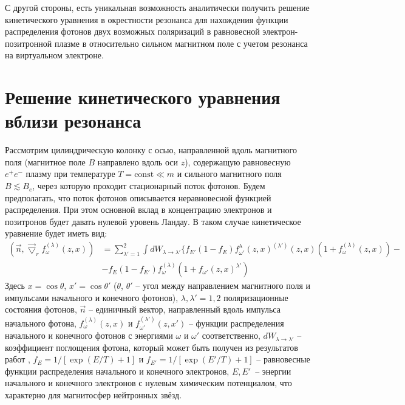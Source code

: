 \documentclass[a4paper]{panl}
\begin{document}
С другой стороны, есть уникальная возможность аналитически получить решение кинетического уравнения в окрестности резонанса для нахождения функции распределения фотонов двух возможных поляризаций в равновесной электрон-позитронной плазме в относительно сильном магнитном поле с учетом резонанса на виртуальном электроне.

\label{sec:preparation}
\section*{Решение кинетического уравнения вблизи резонанса}

Рассмотрим цилиндрическую колонку с осью, направленной вдоль магнитного поля (магнитное поле $B$ направлено вдоль оси $z$), содержащую равновесную $e^+e^-$ плазму при температуре $T=\text{const}\ll m$  и сильного магнитного поля $B\lesssim B_e$, через которую проходит стационарный поток фотонов. Будем предполагать, что поток фотонов описывается неравновесной функцией распределения. При этом основной вклад в концентрацию электронов и позитронов будет давать нулевой уровень Ландау. В таком случае  кинетическое уравнение будет иметь вид:
\begin{equation} 
	\begin{aligned}\label{Kineq:Gen}
	(\vec{n}, \vec{\bigtriangledown}_r f_\omega^{(\lambda)}(z, x))&=\sum_{\lambda'=1}^{2} \int dW_{\lambda\to\lambda'}\{f_{E'}(1-f_E)f^\lambda_{\omega'}(z, x)^{(\lambda')}(z, x) (1+f_\omega^{(\lambda)}(z, x))-
	\\
	&-f_E (1-f_{E'}) f_\omega^{(\lambda)}(1+f_{\omega'}(z, x)^{\lambda'})
	\end{aligned}
\end{equation}
Здесь $x = \cos \theta$, $x' = \cos \theta'$ ($\theta$, $\theta'$ -- угол между направлением магнитного поля и импульсами начального и конечного фотонов), $\lambda, \lambda'=1,2$ поляризационные состояния фотонов,  $\vec{n}$ -- единичный вектор, направленный вдоль импульса начального фотона, $f^{(\lambda)}_\omega(z, x)$ и $f^{(\lambda')}_{\omega'}(z, x')$ -- функции распределения начального и конечного фотонов с энергиями $\omega$ и $ \omega'$ соответственно, $dW_{\lambda \to \lambda'}$ -- коэффициент поглощения фотона, который может быть получен из результатов работ \cite{YarkovJETP:2017,YarkovJoPCS:2020}, $f_E = 1/[\exp(E/T)+1]$ и $f_{E'} = 1/[\exp(E'/T)+1]$ --  равновесные функции распределения начального и конечного электронов, $E, E'$~-- энергии начального и конечного электронов с нулевым химическим потенциалом, что характерно для магнитосфер нейтронных звёзд.
 
\end{document}
